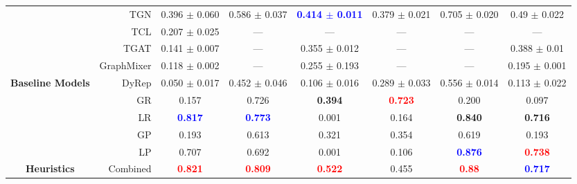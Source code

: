 {\begin{tabular}{@{}crcccccc@{}}
                                            & TGN                             & 0.396 $\pm$ 0.060      & 0.586 $\pm$ 0.037      & \textcolor{blue}{\textbf{0.414 $\pm$ 0.011}}        & 0.379 $\pm$ 0.021         &  0.705 $\pm$ 0.020 & 0.49 $\pm$ 0.022 \\
                                            & TCL                             & 0.207 $\pm$ 0.025      & ---                & ---        & ---                   & ---  & ---                                                        \\
                                            & TGAT                            & 0.141 $\pm$ 0.007      & ---                & 0.355 $\pm$ 0.012        & ---                   & ---   & 0.388 $\pm$ 0.01                                                       \\
                                            & GraphMixer                      & 0.118 $\pm$ 0.002      & ---                & 0.255 $\pm$ 0.193        & ---                   & ---  & 0.195 $\pm$ 0.001                                                        \\
\multirow{-11}{*}{\textbf{Baseline Models}} & DyRep                           & 0.050 $\pm$ 0.017      & 0.452 $\pm$ 0.046      & 0.106 $\pm$ 0.016        & 0.289 $\pm$ 0.033         &  0.556 $\pm$ 0.014 & 0.113 $\pm$ 0.022 \\ \midrule 
                                            & GR                  & 0.157              & 0.726              & \textbf{0.394}                & \textcolor{red}{\textbf{0.723}}                 & 0.200   & 0.097                                                     \\
                                            & LR                   & \textcolor{blue}{\textbf{0.817}}              & \textcolor{blue}{\textbf{0.773}}              & 0.001                & 0.164                 & \textbf{0.840}  & \textbf{0.716}                                                      \\
                                            & GP               & 0.193              & 0.613              & 0.321                & 0.354                 & 0.619  & 0.193                                                      \\
       & LP                & 0.707              & 0.692              & 0.001                & 0.106                 & \textcolor{blue}{\textbf{0.876}}  & \textcolor{red}{\textbf{0.738}}                                                      \\
\multirow{-5}{*}{\textbf{Heuristics}} & Combined                 & \textcolor{red}{\textbf{0.821}}              & \textcolor{red}{\textbf{0.809}}              & \textcolor{red}{\textbf{0.522}}                & 0.455                 & \textcolor{red}{\textbf{0.88}}  & \textcolor{blue}{\textbf{0.717}}                                                       \\
\bottomrule
\end{tabular}%
}
